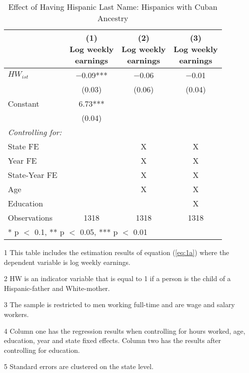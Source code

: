 \begin{table}[H]
\centering\centering
\caption{Effect of Having Hispanic Last Name: Hispanics with Cuban Ancestry  \label{tab:lastnamereg-weekearm-cub}}
\centering
\begin{threeparttable}
\begin{tabular}[t]{lccc}
\toprule
  & \specialcell{(1) \\ Log weekly \\ earnings} & \specialcell{(2) \\ Log weekly \\ earnings} & \specialcell{(3) \\  Log weekly \\ earnings}\\
\midrule
$HW_{ist}$ & \num{-0.09}*** & \num{-0.06} & \num{-0.01}\\
 & (\num{0.03}) & (\num{0.06}) & (\num{0.04})\\
Constant & \num{6.73}*** &  & \\
 & (\num{0.04}) &  & \\
\midrule
\textit{Controlling for:} &  &  & \\
State FE &  & X & X\\
Year FE &  & X & X\\
State-Year FE &  & X & X\\
Age &  & X & X\\
Education &  &  & X\\
Observations & \num{1318} & \num{1318} & \num{1318}\\
\bottomrule
\multicolumn{4}{l}{\rule{0pt}{1em}* p $<$ 0.1, ** p $<$ 0.05, *** p $<$ 0.01}\\
\end{tabular}
\begin{tablenotes}
\item[1] {\footnotesize{This table includes the estimation results of equation (\ref{eq:1a}) where the dependent variable is log weekly earnings.}}
\item[2] {\footnotesize{HW is an indicator variable that is equal to 1 if a person is the child of a Hispanic-father and White-mother.}}
\item[3] {\footnotesize{The sample is restricted to men working full-time and are wage and salary workers.}}
\item[4] {\footnotesize{Column one has the regression results when controlling for hours worked, age, education, year and state fixed effects. Column two has the results after controlling for education.}}
\item[5] {\footnotesize{Standard errors are clustered on the state level.}}
\end{tablenotes}
\end{threeparttable}
\end{table}
